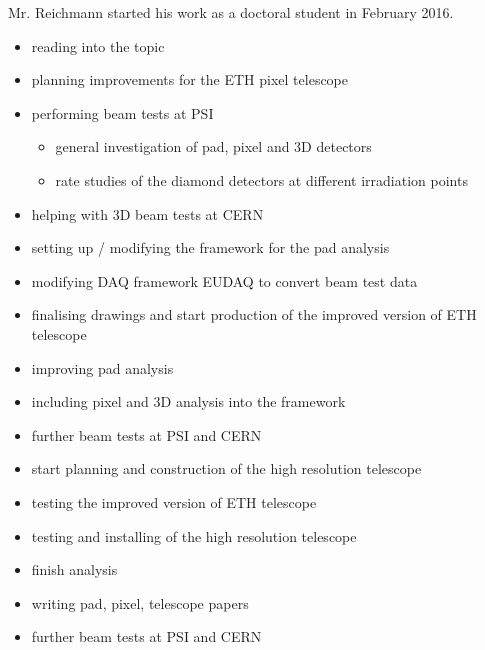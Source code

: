Mr. Reichmann started his work as a doctoral student in February 2016.\parsmall
{}
\begin{itemize}
  \item reading into the topic
  \item planning improvements for the ETH pixel telescope %
  \item performing beam tests at \ac{PSI}
  \begin{itemize}
    \item general investigation of pad, pixel and 3D detectors
    \item rate studies of the diamond detectors at different irradiation points
  \end{itemize}
  \item helping with 3D beam tests at CERN
  \item setting up / modifying the framework for the pad analysis %
  \item modifying \ac{DAQ} framework EUDAQ to convert beam test data %
\end{itemize}
\begin{itemize}
  \item finalising drawings and start production of the improved version of ETH telescope
  \item improving pad analysis
  \item including pixel and 3D analysis into the framework
  \item further beam tests at \ac{PSI} and CERN
  \item start planning and construction of the high resolution telescope
\end{itemize}
\begin{itemize}
  \item testing the improved version of ETH telescope
  \item testing and installing of the high resolution telescope
  \item finish analysis
  \item writing pad, pixel, telescope papers
  \item further beam tests at \ac{PSI} and CERN
\end{itemize}
\parend